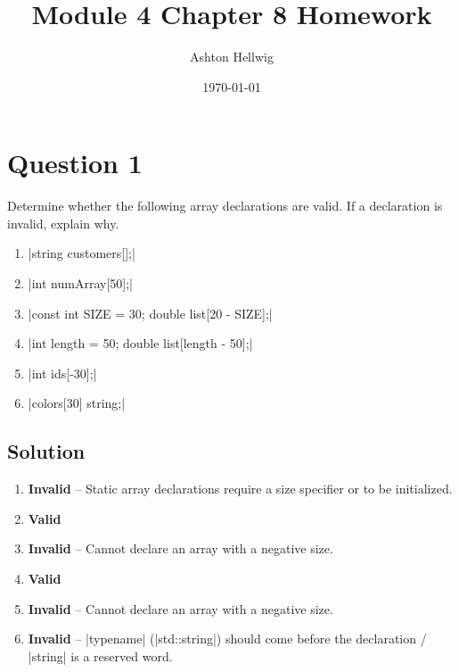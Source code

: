 \documentclass[a4paper, 11pt]{article}
\title{Module 4 Chapter 8 Homework}
\author{Ashton Hellwig}
\date\today
\begin{document}
  \maketitle
  \tableofcontents
  \lstlistoflistings
  \newpage

  \section{Question 1}
    Determine whether the following array declarations are valid. If a
      declaration is invalid, explain why.

    \begin{enumerate}[label=\Alph*.]
      \item |string customers[];|
      \item |int numArray[50];|
      \item |const int SIZE = 30; double list[20 - SIZE];|
      \item |int length = 50; double list[length - 50];|
      \item |int ids[-30];|
      \item |colors[30] string;|
    \end{enumerate}

    \subsection{Solution}
      \begin{enumerate}[label=\alph*.]
        \item \begin{mdframed}[style=AnswerFrame]
          \textbf{Invalid} -- Static array declarations require a
            size specifier or to be initialized.
          \end{mdframed}
        \item \begin{mdframed}[style=AnswerFrame]
          \textbf{Valid}
          \end{mdframed}
        \item \begin{mdframed}[style=AnswerFrame]
          \textbf{Invalid} -- Cannot declare an array with a negative size.
          \end{mdframed}
        \item \begin{mdframed}[style=AnswerFrame]
          \textbf{Valid}
          \end{mdframed}
        \item \begin{mdframed}[style=AnswerFrame]
          \textbf{Invalid} -- Cannot declare an array with a negative size.
          \end{mdframed}
        \item \begin{mdframed}[style=AnswerFrame]
          \textbf{Invalid} -- |typename| (|std::string|) should come before the declaration /
            |string| is a reserved word.
          \end{mdframed}
      \end{enumerate}
\end{document}

